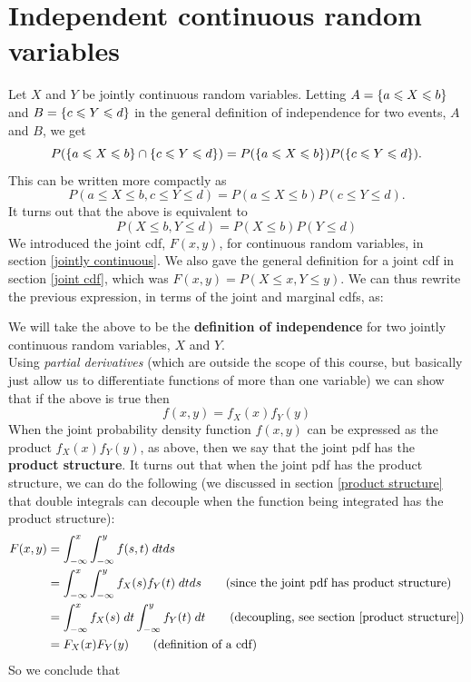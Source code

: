 \section{Independent continuous random variables}
Let $X$ and $Y$ be jointly continuous random variables. Letting $A = \left\{a \leqslant X \leqslant b\right\}$ and $B = \left\{c \leqslant Y \leqslant d\right\}$ in the general definition of independence for two events, $A$ and $B$, we get
\[
P(\left\{a \leqslant X \leqslant b\right\} \cap \left\{c \leqslant Y \leqslant d\right\}) = P(\left\{a \leqslant X \leqslant b\right\})P(\left\{c \leqslant Y \leqslant d\right\}).
\]
This can be written more compactly as
\[
P(a \leq X \leq b, c \leq Y \leq d) = P(a \leq X \leq b)P(c \leq Y \leq d).
\]
It turns out that the above is equivalent to
\[
P(X \leq b, Y \leq d) = P(X \leq b)P(Y \leq d)
\]
We introduced the joint cdf, $F(x,y)$, for continuous random variables, in section \ref{jointly continuous}. We also gave the general definition for a joint cdf in section \ref{joint cdf}, which was $F(x,y) = P(X \leq x, Y \leq y).$ We can thus rewrite the previous expression, in terms of the joint and marginal cdfs, as:

  	\bigskip
	
	\hfil{}
	\bigskip
	\bigskip
	
\noindent We will take the above to be the \textbf{definition of independence} for two jointly continuous random variables, $X$ and $Y$. \\

\noindent Using \textit{partial derivatives} (which are outside the scope of this course, but basically just allow us to differentiate functions of more than one variable) we can show that if the above is true then
\[
f(x,y) = f_X(x)f_Y(y)
\]
\noindent When the joint probability density function $f(x,y)$ can be expressed as the product $f_X(x)f_Y(y)$, as above, then we say that the joint pdf has the \textbf{product structure}. It turns out that when the joint pdf has the product structure, we can do the following (we discussed in section \ref{product structure} that double integrals can decouple when the function being integrated has the product  structure): \label{product structure again}
\begin{align*}
F(x,y) & = \int_{-\infty}^x \int_{-\infty}^y f(s,t) \; dtds \\
	& = \int_{-\infty}^x \int_{-\infty}^y f_X(s)f_Y(t) \; dtds \tag{since the joint pdf has product structure} \\
	& =   \int_{-\infty}^x f_X(s)  \; dt  \int_{-\infty}^y f_Y(t) \; dt  \tag{decoupling, see section \ref{product structure}} \\
	& = F_X(x)F_Y(y) \tag{definition of a cdf}
\end{align*}
So we conclude that

